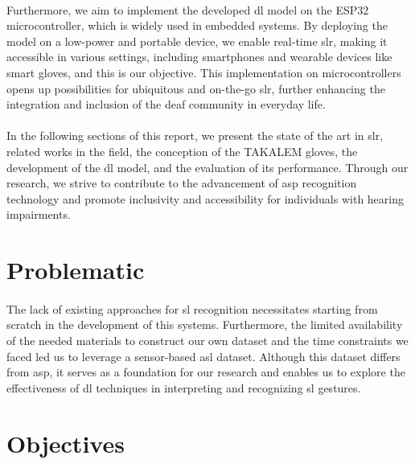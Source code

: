 \paragraph{}
Furthermore, we aim to implement the developed \ac{dl} model on the ESP32 microcontroller, which is widely used in embedded systems. By deploying the model on a low-power and portable device, we enable real-time \ac{slr}, making it accessible in various settings, including smartphones and wearable devices like smart gloves, and this is our objective. This implementation on microcontrollers opens up possibilities for ubiquitous and on-the-go \ac{slr}, further enhancing the integration and inclusion of the deaf community in everyday life.
\paragraph{}
In the following sections of this report, we present the state of the art in \ac{slr}, related works in the field, the conception of the TAKALEM gloves, the development of the \ac{dl} model, and the evaluation of its performance. Through our research, we strive to contribute to the advancement of \ac{asp} recognition technology and promote inclusivity and accessibility for individuals with hearing impairments.

\section*{Problematic}
\paragraph{}
The lack of existing approaches for \ac{sl} recognition necessitates starting from scratch in the development of this systems. Furthermore, the limited availability of the needed materials to construct our own dataset and the time constraints we faced led us to leverage a sensor-based \ac{asl} dataset. Although this dataset differs from \ac{asp}, it serves as a foundation for our research and enables us to explore the effectiveness of \ac{dl} techniques in interpreting and recognizing \ac{sl} gestures.

\section*{Objectives}
